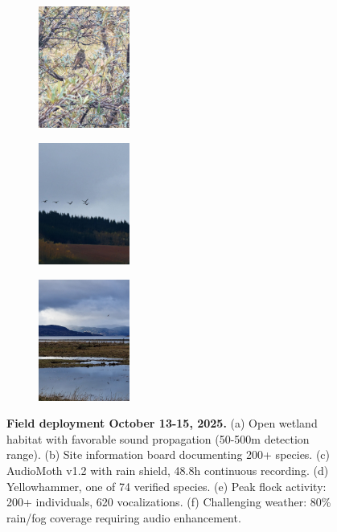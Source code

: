 \documentclass[english,twocolumn]{article}
\begin{document}
\begin{figure}[t]
\begin{subfigure}{0.3\textwidth}
\centering
\includegraphics[width=\textwidth,height=4cm,keepaspectratio]{05_camouflaged_bird_vegetation.jpg}
\caption{}
\end{subfigure}
\hfill
\begin{subfigure}{0.3\textwidth}
\centering
\includegraphics[width=\textwidth,height=4cm,keepaspectratio]{06_geese_flight_formation.jpg}
\caption{}
\end{subfigure}
\hfill
\begin{subfigure}{0.3\textwidth}
\centering
\includegraphics[width=\textwidth,height=4cm,keepaspectratio]{07_wetland_waterfowl_dramatic.jpg}
\caption{}
\end{subfigure}

\caption{\textbf{Field deployment October 13-15, 2025.} (a) Open wetland habitat with favorable sound propagation (50-500m detection range). (b) Site information board documenting 200+ species. (c) AudioMoth v1.2 with rain shield, 48.8h continuous recording. (d) Yellowhammer, one of 74 verified species. (e) Peak flock activity: 200+ individuals, 620 vocalizations. (f) Challenging weather: 80\% rain/fog coverage requiring audio enhancement.}
\label{fig:field_deployment}
\end{figure}
\end{document}
